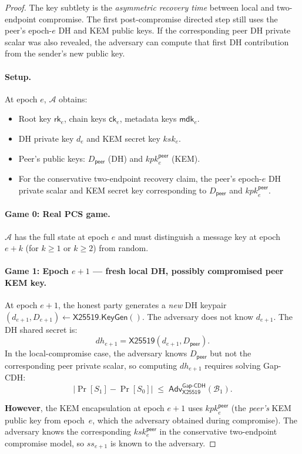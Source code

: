 \documentclass[11pt,a4paper]{article}
\theoremstyle{definition}
\theoremstyle{remark}
\newcommand{\adv}{\mathsf{Adv}}
\newcommand{\advA}{\mathcal{A}}
\newcommand{\advB}{\mathcal{B}}
\renewcommand{\DH}{\mathsf{X25519}}
\newcommand{\KeyGen}{\mathsf{KeyGen}}
\newcommand{\GapCDH}{\mathsf{Gap\text{-}CDH}}
\newcommand{\rk}{\mathsf{rk}}
\newcommand{\ck}{\mathsf{ck}}
\newcommand{\mdk}{\mathsf{mdk}}
\begin{document}
\begin{proof}
The key subtlety is the \emph{asymmetric recovery time} between local and
two-endpoint compromise. The first post-compromise directed step still uses the
peer's epoch-$e$ DH and KEM public keys. If the corresponding peer DH private
scalar was also revealed, the adversary can compute that first DH contribution
from the sender's new public key.

\paragraph{Setup.} At epoch $e$, $\advA$ obtains:
\begin{itemize}[nosep]
  \item Root key $\rk_e$, chain keys $\ck_e$, metadata keys $\mdk_e$.
  \item DH private key $d_e$ and KEM secret key $\mathit{ksk}_e$.
  \item Peer's public keys: $D_{\mathsf{peer}}$ (DH) and $\mathit{kpk}_e^{\mathsf{peer}}$ (KEM).
  \item For the conservative two-endpoint recovery claim, the peer's epoch-$e$
        DH private scalar and KEM secret key corresponding to
        $D_{\mathsf{peer}}$ and $\mathit{kpk}_e^{\mathsf{peer}}$.
\end{itemize}

\paragraph{Game 0: Real PCS game.} $\advA$ has the full state at epoch $e$
and must distinguish a message key at epoch $e + k$ (for $k \geq 1$ or $k \geq 2$)
from random.

\paragraph{Game 1: Epoch $e{+}1$ --- fresh local DH, possibly compromised peer KEM key.}
At epoch $e{+}1$, the honest party generates a \emph{new} DH keypair
$(d_{e+1}, D_{e+1}) \gets \DH.\KeyGen()$.  The adversary does not know $d_{e+1}$.
The DH shared secret is:
\[
  \mathit{dh}_{e+1} = \DH(d_{e+1}, D_{\mathsf{peer}}).
\]
In the local-compromise case, the adversary knows $D_{\mathsf{peer}}$ but not
the corresponding peer private scalar, so computing $\mathit{dh}_{e+1}$
requires solving Gap-CDH:
\[
  |\Pr[S_1] - \Pr[S_0]| \;\leq\; \adv^{\GapCDH}_{\DH}(\advB_1).
\]

\textbf{However}, the KEM encapsulation at epoch $e{+}1$ uses
$\mathit{kpk}_e^{\mathsf{peer}}$ (the \emph{peer's} KEM public key from
epoch~$e$, which the adversary obtained during compromise).  The adversary
knows the corresponding $\mathit{ksk}_e^{\mathsf{peer}}$ in the conservative
two-endpoint compromise model, so $\mathit{ss}_{e+1}$ is known to the
adversary.


\end{proof}
\end{document}
